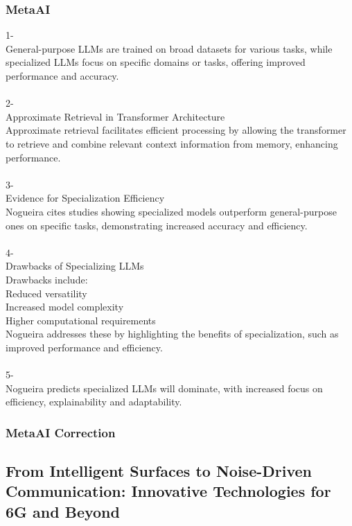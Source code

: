 \subsubsection{MetaAI}
\begin{tcolorbox}[breakable]
1-\\
General-purpose LLMs are trained on broad datasets for various tasks, while specialized LLMs focus on specific domains or tasks, offering improved performance and accuracy.\\
\\
2-\\
Approximate Retrieval in Transformer Architecture\\
Approximate retrieval facilitates efficient processing by allowing the transformer to retrieve and combine relevant context information from memory, enhancing performance.\\
\\
3-\\
Evidence for Specialization Efficiency\\
Nogueira cites studies showing specialized models outperform general-purpose ones on specific tasks, demonstrating increased accuracy and efficiency.\\
\\
4-\\
Drawbacks of Specializing LLMs\\
Drawbacks include:\\
Reduced versatility\\
Increased model complexity\\
Higher computational requirements\\
Nogueira addresses these by highlighting the benefits of specialization, such as improved performance and efficiency.\\
\\
5-\\
Nogueira predicts specialized LLMs will dominate, with increased focus on efficiency, explainability and adaptability.\\
\end{tcolorbox}
\subsubsection{MetaAI Correction}
\begin{tcolorbox}[breakable]
    
\end{tcolorbox}


\subsection{From Intelligent Surfaces to Noise-Driven Communication: Innovative Technologies for 6G and Beyond}

